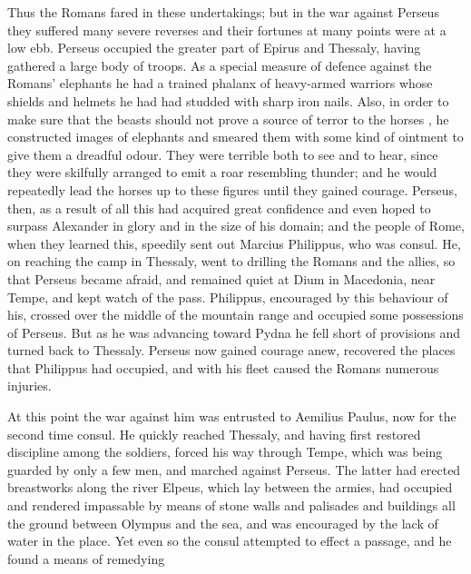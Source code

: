 Thus the Romans fared in these undertakings; but in the war against Perseus they suffered many severe reverses and their fortunes at many points were at a low ebb. Perseus occupied the greater part of Epirus and Thessaly, having gathered a large body of troops. As a special measure of defence against the Romans' elephants he had a trained phalanx of heavy-armed warriors whose shields and helmets he had had studded with sharp iron nails. Also, in order to make sure that the beasts should not prove a source of terror to the horses , he constructed images of elephants and smeared them with some kind of ointment to give them a dreadful odour. They were terrible both to see and to hear, since they were skilfully arranged to emit a roar resembling thunder; and he would repeatedly lead the horses up to these figures until they gained courage. Perseus, then, as a result of all this had acquired great confidence and even hoped to surpass Alexander in glory and in the size of his domain; and the people of Rome, when they learned this, speedily sent out Marcius Philippus, who was consul. He, on reaching the camp in Thessaly, went to drilling the Romans and the allies, so that Perseus became afraid, and remained quiet at Dium in Macedonia, near Tempe, and kept watch of the pass. Philippus, encouraged by this behaviour of his, crossed over the middle of the mountain range and occupied some possessions of Perseus. But as he was advancing toward Pydna he fell short of provisions and turned back to Thessaly. Perseus now gained courage anew, recovered the places that Philippus had occupied, and with his fleet caused the Romans numerous injuries.

At this point the war against him was entrusted to Aemilius Paulus, now for the second time consul. He quickly reached Thessaly, and having first restored discipline among the soldiers, forced his way through Tempe, which was being guarded by only a few men, and marched against Perseus. The latter had erected breastworks along the river Elpeus, which lay between the armies, had occupied and rendered impassable by means of stone walls and palisades and buildings all the ground between Olympus and the sea, and was encouraged by the lack of water in the place. Yet even so the consul attempted to effect a passage, and he found a means of remedying


